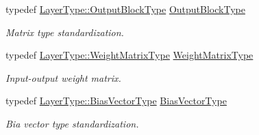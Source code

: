 \begin{DoxyCompactItemize}
typedef \hyperlink{classffnn_1_1layer_1_1_fully_connected_ac8c5ba1f20f470095c2c37f881f49814}{Layer\-Type\-::\-Output\-Block\-Type} \hyperlink{classffnn_1_1optimizer_1_1_gradient_descent_3_01layer_1_1_fully_connected_3_01_value_type_00_01_5f7b01db2ae4d39760d70ee323649a60_a656744c50766c58b1b094db14c2bfc44}{Output\-Block\-Type}
\begin{DoxyCompactList}\small\item\em Matrix type standardization. \end{DoxyCompactList}\item 
typedef \hyperlink{classffnn_1_1layer_1_1_fully_connected_a4ceb72064ac9a73a0907cc369d229da0}{Layer\-Type\-::\-Weight\-Matrix\-Type} \hyperlink{classffnn_1_1optimizer_1_1_gradient_descent_3_01layer_1_1_fully_connected_3_01_value_type_00_01_5f7b01db2ae4d39760d70ee323649a60_a0d3b5fe84f944e4695a094f40f6a8bec}{Weight\-Matrix\-Type}
\begin{DoxyCompactList}\small\item\em Input-\/output weight matrix. \end{DoxyCompactList}\item 
typedef \hyperlink{classffnn_1_1layer_1_1_fully_connected_a926ff519682fa1bedd4c38159d5fd4bb}{Layer\-Type\-::\-Bias\-Vector\-Type} \hyperlink{classffnn_1_1optimizer_1_1_gradient_descent_3_01layer_1_1_fully_connected_3_01_value_type_00_01_5f7b01db2ae4d39760d70ee323649a60_aaca17a8f41752429974c4ba7e98bdb47}{Bias\-Vector\-Type}
\begin{DoxyCompactList}\small\item\em Bia vector type standardization. \end{DoxyCompactList}\end{DoxyCompactItemize}
